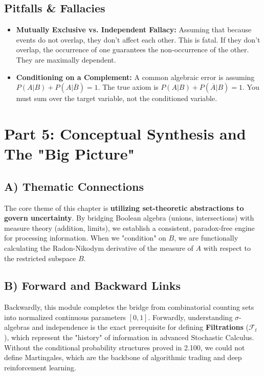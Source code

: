 \documentclass[11pt, letterpaper]{article}
\theoremstyle{definition}
\begin{document}
\subsection{Pitfalls \& Fallacies}
\begin{itemize}
    \item \textbf{Mutually Exclusive vs. Independent Fallacy:} Assuming that because events do not overlap, they don't affect each other. This is fatal. If they don't overlap, the occurrence of one guarantees the non-occurrence of the other. They are maximally dependent.
    \item \textbf{Conditioning on a Complement:} A common algebraic error is assuming $P(A|B) + P(A|\overline{B}) = 1$. The true axiom is $P(A|B) + P(\overline{A}|B) = 1$. You must sum over the target variable, not the conditioned variable.
\end{itemize}

\newpage
\section{Part 5: Conceptual Synthesis and The "Big Picture"}

\subsection{A) Thematic Connections}
The core theme of this chapter is \textbf{utilizing set-theoretic abstractions to govern uncertainty}. By bridging Boolean algebra (unions, intersections) with measure theory (addition, limits), we establish a consistent, paradox-free engine for processing information. When we "condition" on $B$, we are functionally calculating the Radon-Nikodym derivative of the measure of $A$ with respect to the restricted subspace $B$.

\subsection{B) Forward and Backward Links}
Backwardly, this module completes the bridge from combinatorial counting sets into normalized continuous parameters $[0,1]$. Forwardly, understanding $\sigma$-algebras and independence is the exact prerequisite for defining \textbf{Filtrations} ($\mathscr{F}_t$), which represent the "history" of information in advanced Stochastic Calculus. Without the conditional probability structures proved in 2.100, we could not define Martingales, which are the backbone of algorithmic trading and deep reinforcement learning.
\end{document}
